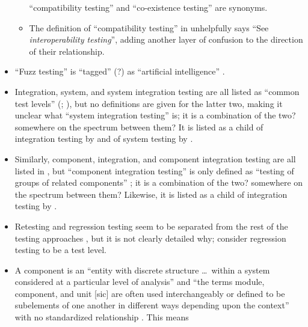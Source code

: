 \begin{itemize}
\begin{itemize}
                        ``compatibility testing'' and ``co-existence testing''
                        are synonyms.
                  \item The definition of ``compatibility testing'' in
                        \citep[p.~43]{Kam2008} unhelpfully says ``See
                        \emph{interoperability testing}'', adding another
                        layer of confusion to the direction of their
                        relationship.
            \end{itemize}
            \ifnotpaper
      \item ``Fuzz testing'' is ``tagged'' (?) as ``artificial intelligence''
            \citep[p.~5]{IEEE2022}.
      \item Integration, system, and system integration testing are all listed
            as ``common test levels'' (\citealp[p.~12]{IEEE2022};
            \citeyear[p.~6]{IEEE2021}), but no
            definitions are given for the latter two, making it unclear what
            ``system integration testing'' is; it is a combination of the two?
            somewhere on the spectrum between them? It is listed as a child
            of integration testing by \citetISTQB{} and of system testing
            by \citet[p.~23]{Firesmith2015}.
      \item Similarly, component, integration, and component integration
            testing are all listed in \citep{IEEE2017}, but ``component
            integration testing'' is only defined as ``testing of groups of
            related components'' \citep[p.~82]{IEEE2017}; it is a combination of
            the two? somewhere on the spectrum between them? Likewise, it is
            listed as a child of integration testing by \citetISTQB{}.
            \fi
      \item Retesting and regression testing seem to be separated from the rest
            of the testing approaches \citep[p.~23]{IEEE2022}, but it is not
            clearly detailed why; \citet[p.~3]{BarbosaEtAl2006} consider
            regression testing to be a test level.
      \item A component is an ``entity with discrete structure \dots\ within a
            system considered at a particular level of analysis''
            \citep{ISO_IEC2023b} and ``the terms module, component, and unit
                  [sic] are often used interchangeably or defined to be subelements
            of one another in different ways depending upon the context'' with
            no standardized relationship \citep[p.~82]{IEEE2017}. This means

\end{itemize}
